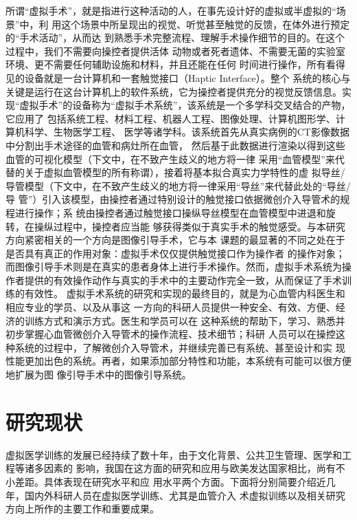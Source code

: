 所谓“虚拟手术”，就是指进行这种活动的人，在事先设计好的虚拟或半虚拟的“场景”中，利
用这个场景中所呈现出的视觉、听觉甚至触觉的反馈，在体外进行预定的“手术活动”，从而达
到熟悉手术完整流程、理解手术操作细节的目的。在这个过程中，我们不需要向操控者提供活体
动物或者死者遗体、不需要无菌的实验室环境、更不需要任何辅助设施和材料，并且还能在任何
时间进行操作，所有看得见的设备就是一台计算机和一套触觉接口（Haptic Interface）。整个
系统的核心与关键是运行在这台计算机上的软件系统，它为操控者提供充分的视觉反馈信息。实
现“虚拟手术”的设备称为“虚拟手术系统”，该系统是一个多学科交叉结合的产物，它应用了
包括系统工程、材料工程、机器人工程、图像处理、计算机图形学、计算机科学、生物医学工程、
医学等诸学科。该系统首先从真实病例的CT影像数据中分割出手术途径的血管和病灶所在血管，
然后基于此数据进行渲染以得到这些血管的可视化模型（下文中，在不致产生歧义的地方将一律
采用“血管模型”来代替的关于虚拟血管模型的所有称谓），接着将基本拟合真实力学特性的虚
拟导丝/导管模型（下文中，在不致产生歧义的地方将一律采用“导丝”来代替此处的“导丝/导
管”）引入该模型，由操控者通过特别设计的触觉接口依据微创介入导管术的规程进行操作；系
统由操控者通过触觉接口操纵导丝模型在血管模型中进退和旋转，在操纵过程中，操控者应当能
够获得类似于真实手术的触觉感受。与本研究方向紧密相关的一个方向是图像引导手术，它与本
课题的最显著的不同之处在于是否具有真正的作用对象：虚拟手术仅仅提供触觉接口作为操作者
的操作对象；而图像引导手术则是在真实的患者身体上进行手术操作。然而，虚拟手术系统为操
作者提供的有效操作动作与真实的手术中的主要动作完全一致，从而保证了手术训练的有效性。
虚拟手术系统的研究和实现的最终目的，就是为心血管内科医生和相应专业的学员、以及从事这
一方向的科研人员提供一种安全、有效、方便、经济的训练方式和演示方式。医生和学员可以在
这种系统的帮助下，学习、熟悉并初步掌握心血管微创介入导管术的操作流程、技术细节；科研
人员可以在操控这种系统的过程中，了解微创介入导管术，并继续完善已有系统、甚至设计和实
现性能更加出色的系统。再者，如果添加部分特性和功能，本系统有可能可以很方便地扩展为图
像引导手术中的图像引导系统。

\section{研究现状}


虚拟医学训练的发展已经持续了数十年，由于文化背景、公共卫生管理、医学和工程等诸多因素的
影响，我国在这方面的研究和应用与欧美发达国家相比，尚有不小差距。具体表现在研究水平和应
用水平两个方面。下面将分别简要介绍近几年，国内外科研人员在虚拟医学训练、尤其是血管介入
术虚拟训练以及相关研究方向上所作的主要工作和重要成果。

